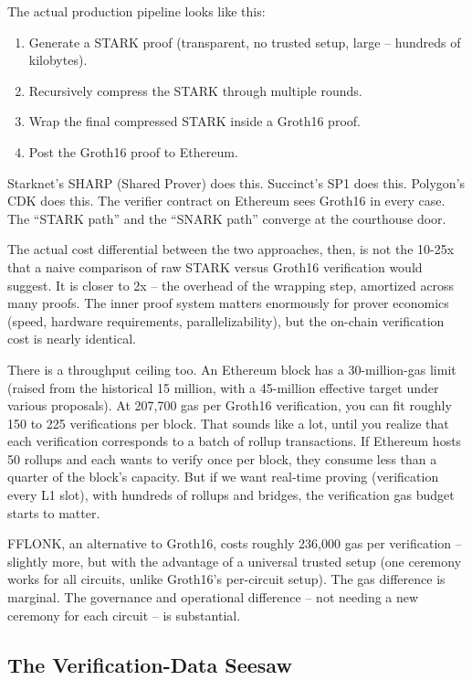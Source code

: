 \documentclass[
  11pt,
  openany]{report}
\providecommand{\tightlist}{%
  \setlength{\itemsep}{0pt}\setlength{\parskip}{0pt}}
\begin{document}
The actual production pipeline looks like this:

\begin{enumerate}
\def\labelenumi{\arabic{enumi}.}
\tightlist
\item
  Generate a STARK proof (transparent, no trusted setup, large -- hundreds of
  kilobytes).
\item
  Recursively compress the STARK through multiple rounds.
\item
  Wrap the final compressed STARK inside a Groth16 proof.
\item
  Post the Groth16 proof to Ethereum.
\end{enumerate}

Starknet's SHARP (Shared Prover) does this. Succinct's SP1 does this. Polygon's
CDK does this. The verifier contract on Ethereum sees Groth16 in every case. The
``STARK path'' and the ``SNARK path'' converge at the courthouse door.

The actual cost differential between the two approaches, then, is not the 10-25x
that a naive comparison of raw STARK versus Groth16 verification would suggest.
It is closer to 2x -- the overhead of the wrapping step, amortized across many
proofs. The inner proof system matters enormously for prover economics (speed,
hardware requirements, parallelizability), but the on-chain verification cost is
nearly identical.

There is a throughput ceiling too. An Ethereum block has a 30-million-gas limit
(raised from the historical 15 million, with a 45-million effective target under
various proposals). At 207,700 gas per Groth16 verification, you can fit roughly
150 to 225 verifications per block. That sounds like a lot, until you realize
that each verification corresponds to a batch of rollup transactions. If
Ethereum hosts 50 rollups and each wants to verify once per block, they consume
less than a quarter of the block's capacity. But if we want real-time proving
(verification every L1 slot), with hundreds of rollups and bridges, the
verification gas budget starts to matter.

FFLONK, an alternative to Groth16, costs roughly 236,000 gas per verification --
slightly more, but with the advantage of a universal trusted setup (one ceremony
works for all circuits, unlike Groth16's per-circuit setup). The gas difference
is marginal. The governance and operational difference -- not needing a new
ceremony for each circuit -- is substantial.

\subsection{The Verification-Data Seesaw}\label{the-verification-data-seesaw}
\end{document}
